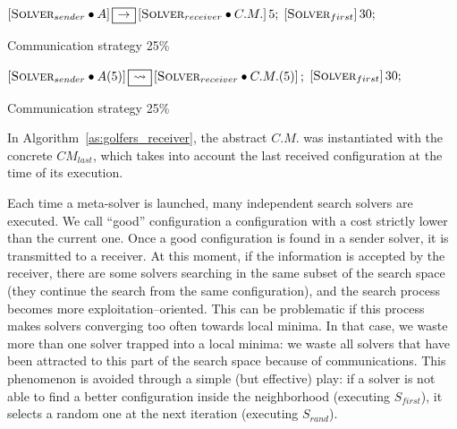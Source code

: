 \begin{algorithm}
\dontprintsemicolon
\SetNoline
$\left[\eqsolverposl{sender}\posldot A\right] \onetoone \left[\eqsolverposl{receiver}\posldot C.M.\right]5;$\;
$\left[\textbf{{\sc Solver}}_{first}\right]30;$
\caption{Communication strategy \oneTone{} 25\%}\label{comm:golfers_1_1-1_25}
\end{algorithm}

\begin{algorithm}
\dontprintsemicolon
\SetNoline
$\left[\eqsolverposl{sender}\posldot A(5)\right] \oneton \left[\eqsolverposl{receiver}\posldot C.M.(5)\right];$\;
$\left[\textbf{{\sc Solver}}_{first}\right]30;$
\caption{Communication strategy \oneTn{} 25\%}\label{comm:golfers_1_1-n_25}
\end{algorithm}

In Algorithm~\ref{as:golfers_receiver}, the abstract \opch{} $C.M.$ was instantiated with the concrete \opch{} $CM_{last}$, which takes into account the last received configuration at the time of its execution.

Each time a \posl{} meta-solver is launched, many independent search solvers are executed. We call ``good'' configuration a configuration %
with a cost strictly lower than the current one. Once a good configuration is found in a sender solver, it is transmitted to a receiver. At this moment, if the information is accepted by the receiver, there are some solvers searching in the same subset of the search space (\ie they continue the search from the same configuration), and the search process becomes more exploitation--oriented. This can be problematic if this process makes solvers converging too often towards local minima. In that case, we waste more than one solver trapped into a local minima: we waste all solvers that have been attracted to this part of the search space because of communications. This phenomenon is avoided through a simple (but effective) play: if a solver is not able to find a better configuration inside the neighborhood (executing $S_{first}$), it selects a random one at the next iteration (executing $S_{rand}$).


